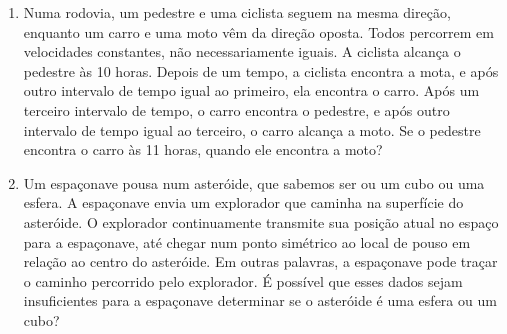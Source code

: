 \documentclass{article}
\begin{document}
\begin{enumerate}
    \item Numa rodovia, um pedestre e uma ciclista seguem na mesma direção, enquanto um carro e uma moto vêm da direção oposta. Todos percorrem em velocidades constantes, não necessariamente iguais. A ciclista alcança o pedestre às 10 horas. Depois de um tempo, a ciclista encontra a mota, e após outro intervalo de tempo igual ao primeiro, ela encontra o carro. Após um terceiro intervalo de tempo, o carro encontra o pedestre, e após outro intervalo de tempo igual ao terceiro, o carro alcança a moto. Se o pedestre encontra o carro às 11 horas, quando ele encontra a moto?
    
    \item Um espaçonave pousa num asteróide, que sabemos ser ou um cubo ou uma esfera. A espaçonave envia um explorador que caminha na superfície do asteróide. O explorador continuamente transmite sua posição atual no espaço para a espaçonave, até chegar num ponto simétrico ao local de pouso em relação ao centro do asteróide. Em outras palavras, a espaçonave pode traçar o caminho percorrido pelo explorador. É possível que esses dados sejam insuficientes para a espaçonave determinar se o asteróide é uma esfera ou um cubo?
\end{enumerate}
\end{document}
